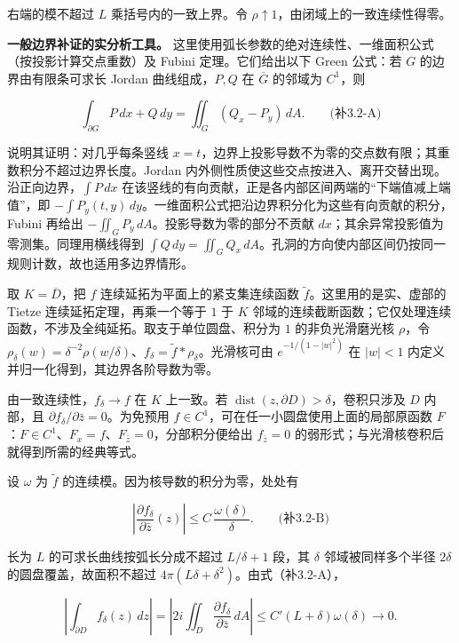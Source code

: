 \documentclass[11pt,a4paper]{article}
\begin{document}
右端的模不超过 \(L\) 乘括号内的一致上界。令
\(\rho\uparrow1\)，由闭域上的一致连续性得零。

\textbf{一般边界补证的实分析工具。}
这里使用弧长参数的绝对连续性、一维面积公式（按投影计算交点重数）及
Fubini 定理。它们给出以下 Green 公式：若 \(G\) 的边界由有限条可求长
Jordan 曲线组成，\(P,Q\) 在 \(\overline G\) 的邻域为 \(C^1\)，则

\[
\int_{\partial G}P\,dx+Q\,dy
=\iint_G(Q_x-P_y)\,dA.
\qquad\text{(补3.2-A)}
\]

说明其证明：对几乎每条竖线
\(x=t\)，边界上投影导数不为零的交点数有限；其重数积分不超过边界长度。Jordan
内外侧性质使这些交点按进入、离开交替出现。沿正向边界，\(\int P\,dx\)
在该竖线的有向贡献，正是各内部区间两端的``下端值减上端值''，即
\(-\int P_y(t,y)\,dy\)。一维面积公式把沿边界积分化为这些有向贡献的积分，Fubini
再给出 \(-\iint_G P_y\,dA\)。投影导数为零的部分不贡献
\(dx\)；其余异常投影值为零测集。同理用横线得到
\(\int Q\,dy=\iint_G Q_x\,dA\)。孔洞的方向使内部区间仍按同一规则计数，故也适用多边界情形。

取 \(K=\overline D\)，把 \(f\) 连续延拓为平面上的紧支集连续函数
\(\widetilde f\)。这里用的是实、虚部的 Tietze 连续延拓定理，再乘一个等于
\(1\) 于 \(K\)
邻域的连续截断函数；它仅处理连续函数，不涉及全纯延拓。取支于单位圆盘、积分为
\(1\) 的非负光滑磨光核 \(\rho\)，令
\(\rho_\delta(w)=\delta^{-2}\rho(w/\delta)\)、\(f_\delta=\widetilde f*\rho_\delta\)。光滑核可由
\(e^{-1/(1-|w|^2)}\) 在 \(|w|<1\)
内定义并归一化得到，其边界各阶导数为零。

由一致连续性，\(f_\delta\to f\) 在 \(K\) 上一致。若
\(\operatorname{dist}(z,\partial D)>\delta\)，卷积只涉及 \(D\) 内部，且
\(\partial f_\delta/\partial\bar z=0\)。为免预用
\(f\in C^1\)，可在任一小圆盘使用上面的局部原函数
\(F\)：\(F\in C^1\)、\(F_x=f\)、\(F_{\bar z}=0\)，分部积分便给出
\(f_{\bar z}=0\) 的弱形式；与光滑核卷积后就得到所需的经典等式。

设 \(\omega\) 为 \(\widetilde f\) 的连续模。因为核导数的积分为零，处处有

\[
\left|\frac{\partial f_\delta}{\partial\bar z}(z)\right|
\le C\,\frac{\omega(\delta)}{\delta}.
\qquad\text{(补3.2-B)}
\]

长为 \(L\) 的可求长曲线按弧长分成不超过 \(L/\delta+1\) 段，其 \(\delta\)
邻域被同样多个半径 \(2\delta\) 的圆盘覆盖，故面积不超过
\(4\pi(L\delta+\delta^2)\)。由式（补3.2-A），

\[
\left|\int_{\partial D}f_\delta(z)\,dz\right|
=\left|2i\iint_D\frac{\partial f_\delta}{\partial\bar z}\,dA\right|
\le C'(L+\delta)\omega(\delta)\longrightarrow0.
\]
\end{document}
